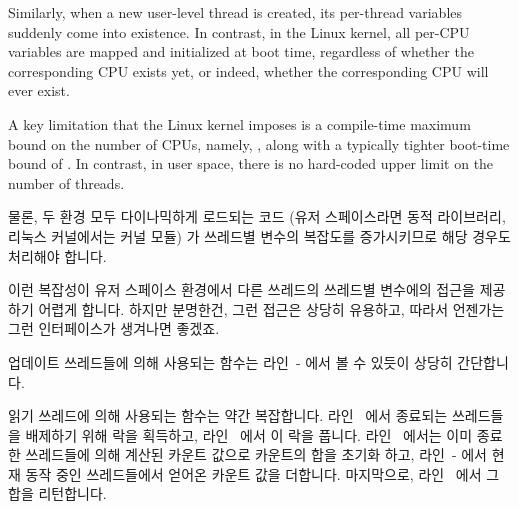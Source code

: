 \begin{lineref}
{	Similarly, when a new user-level thread is created, its
	per-thread variables suddenly come into existence.
	In contrast, in the Linux kernel, all per-CPU variables are
	mapped and initialized at boot time, regardless of whether
	the corresponding CPU exists yet, or indeed, whether the
	corresponding CPU will ever exist.

	A key limitation that the Linux kernel imposes is a compile-time
	maximum bound on the number of CPUs, namely, ,
	along with a typically tighter boot-time bound of .
	In contrast, in user space, there is no hard-coded upper limit
	on the number of threads.
	\fi

	물론, 두 환경 모두 다이나믹하게 로드되는 코드 (유저 스페이스라면 동적
	라이브러리, 리눅스 커널에서는 커널 모듈) 가 쓰레드별 변수의 복잡도를
	증가시키므로 해당 경우도 처리해야 합니다.

	이런 복잡성이 유저 스페이스 환경에서 다른 쓰레드의 쓰레드별 변수에의
	접근을 제공하기 어렵게 합니다.
	하지만 분명한건, 그런 접근은 상당히 유용하고, 따라서 언젠가는 그런
	인터페이스가 생겨나면 좋겠죠.

} \QuickQuizEnd

\begin{lineref}
업데이트 쓰레드들에 의해 사용되는  함수는
라인~- 에서 볼 수 있듯이 상당히 간단합니다.

\end{lineref}

\begin{lineref}
읽기 쓰레드에 의해 사용되는  함수는 약간 복잡합니다.
라인~ 에서 종료되는 쓰레드들을 배제하기 위해 락을 획득하고,
라인~ 에서 이 락을 풉니다.
라인~ 에서는 이미 종료한 쓰레드들에 의해 계산된 카운트 값으로
카운트의 합을 초기화 하고, 라인~- 에서 현재 동작
중인 쓰레드들에서 얻어온 카운트 값을 더합니다.
마지막으로, 라인~ 에서 그 합을 리턴합니다.
\iffalse


\end{lineref}
\end{lineref}
